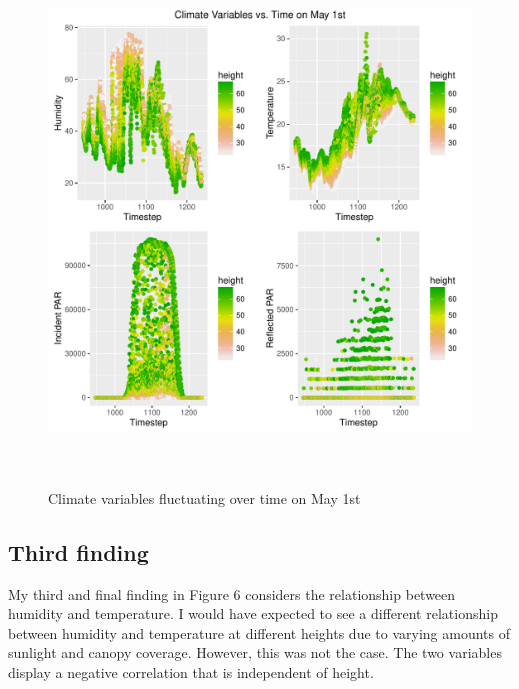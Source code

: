 \documentclass[11pt]{article}
\begin{document}
\begin{figure}
  \centering
    \includegraphics[width=\textwidth,height=14cm]{../graphs/finding2.pdf}
  \caption{Climate variables fluctuating over time on May 1st}
  \label{fig:find2}
\end{figure}


\subsection{Third finding}
My third and final finding in Figure 6 considers the relationship between humidity and temperature. I would have expected to see a different relationship between humidity and temperature at different heights due to varying amounts of sunlight and canopy coverage. However, this was not the case. The two variables display a negative correlation that is independent of height. 
\end{document}
